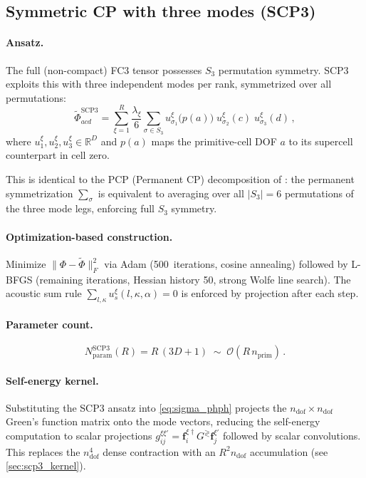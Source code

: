 \documentclass[11pt]{article}
\newcommand{\vc}[1]{\bm{#1}}
\newcommand{\ndof}{n_{\mathrm{dof}}}
\newcommand{\nprim}{n_{\mathrm{prim}}}
\newcommand{\cO}{\mathcal{O}}
\begin{document}
\subsection{Symmetric CP with three modes (SCP3)}
\label{sec:scp3}

\paragraph{Ansatz.}
The full (non-compact) FC3 tensor possesses $S_3$ permutation symmetry.
SCP3 exploits this with three independent modes per rank, symmetrized
over all permutations:
\begin{equation}\label{eq:scp3}
  \boxed{
    \tilde\Phi_{acd}^{\mathrm{SCP3}}
    = \sum_{\xi=1}^{R} \frac{\lambda_\xi}{6}
      \sum_{\sigma \in S_3}
      u^{\xi}_{\sigma_1}\!\bigl(p(a)\bigr)\;
      u^{\xi}_{\sigma_2}(c)\;
      u^{\xi}_{\sigma_3}(d)\,,
  }
\end{equation}
where $u^{\xi}_1, u^{\xi}_2, u^{\xi}_3 \in \mathbb{R}^D$ and
$p(a)$ maps the primitive-cell DOF $a$ to its supercell counterpart
in cell zero.

This is identical to the PCP (Permanent CP) decomposition of
\cite{luo_tensor_2025}: the permanent symmetrization $\sum_\sigma$ is
equivalent to averaging over all $|S_3| = 6$ permutations of the three
mode legs, enforcing full $S_3$ symmetry.

\paragraph{Optimization-based construction.}
Minimize $\|\Phi - \tilde\Phi\|_F^2$ via Adam (500~iterations, cosine
annealing) followed by L-BFGS (remaining iterations, Hessian history
50, strong Wolfe line search).  The acoustic sum rule
$\sum_{l,\kappa} u^\xi_s(l,\kappa,\alpha) = 0$ is enforced by
projection after each step.

\paragraph{Parameter count.}
\begin{equation}\label{eq:scp3-params}
  N_{\mathrm{param}}^{\mathrm{SCP3}}(R) = R\,(3D + 1)
  \;\sim\; \cO(R\,\nprim)\,.
\end{equation}

\paragraph{Self-energy kernel.}
Substituting the SCP3 ansatz into \cref{eq:sigma_phph} projects the
$\ndof \times \ndof$ Green's function matrix onto the mode vectors,
reducing the self-energy computation to scalar projections
$g_{ij}^{\xi\xi'} = \vc{f}_i^{\xi\dagger} G^{\gtrless}
\vc{f}_j^{\xi'}$ followed by scalar convolutions.  This replaces the
$\ndof^4$ dense contraction with an $R^2 \ndof$ accumulation (see
\cref{sec:scp3_kernel}).
\end{document}
